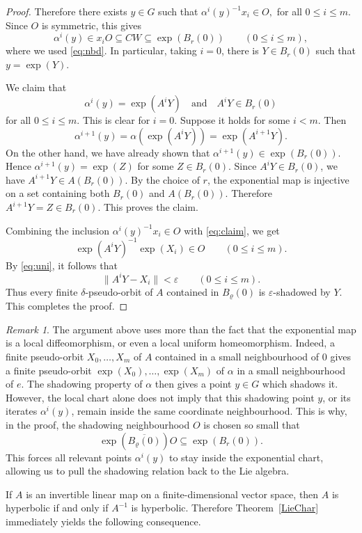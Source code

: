 \documentclass[12pt]{amsart}
\theoremstyle{definition}
\numberwithin{equation}{section}
\theoremstyle{remark}
\newtheorem{remark}[theorem]{Remark}
\begin{document}
\begin{proof}
Therefore there exists $y\in G$ such that
$
\alpha^i(y)^{-1}x_i\in O,
$
for all $0\leq i\leq m$.
Since $O$ is symmetric, this gives
\[
\alpha^i(y)\in x_iO\subseteq CW\subseteq \exp(B_r(0))
\qquad (0\leq i\leq m),
\]
where we used \eqref{eq:nbd}. In particular, taking
$i=0$, there is $Y\in B_r(0)$ such that
$
y=\exp(Y).
$

We claim that
\begin{equation}\label{eq:claim}
\alpha^i(y)=\exp(A^iY)
\quad\text{and}\quad
A^iY\in B_r(0)
\end{equation}
for all $0\leq i\leq m$. This is clear for $i=0$. Suppose it holds for
some $i<m$. Then
\[
\alpha^{i+1}(y)
=
\alpha(\exp(A^iY))
=
\exp(A^{i+1}Y).
\]
On the other hand, we have already shown that
$\alpha^{i+1}(y)\in\exp(B_r(0))$. Hence
$\alpha^{i+1}(y)=\exp(Z)$ for some $Z\in B_r(0)$. Since
$A^iY\in B_r(0)$, we have $A^{i+1}Y\in A(B_r(0))$. By the choice of $r$,
the exponential map is injective on a set containing both $B_r(0)$ and
$A(B_r(0))$. Therefore $A^{i+1}Y=Z\in B_r(0)$. This proves the claim.

Combining the inclusion $\alpha^i(y)^{-1}x_i\in O$
 with
\eqref{eq:claim}, we get
\[
\exp(A^iY)^{-1}\exp(X_i)\in O
\qquad (0\leq i\leq m).
\]
By \eqref{eq:uni}, it follows that
\[
\|A^iY-X_i\|<\varepsilon
\qquad (0\leq i\leq m).
\]
Thus every finite $\delta$-pseudo-orbit of $A$ contained in
$B_\varrho(0)$ is $\varepsilon$-shadowed by $Y$.
This completes the proof.
\end{proof}

\begin{remark}
The argument above uses more than the fact that the exponential map is a
local diffeomorphism, or even a local uniform homeomorphism. Indeed, a finite
pseudo-orbit $X_0,\ldots,X_m$ of $A$ contained in a small neighbourhood of
$0$ gives a finite pseudo-orbit $\exp(X_0),\ldots,\exp(X_m)$ of $\alpha$ in
a small neighbourhood of $e$. The shadowing property of $\alpha$ then gives
a point $y\in G$ which shadows it. However, the local chart alone does not
imply that this shadowing point $y$, or its iterates $\alpha^i(y)$, remain
inside the same coordinate neighbourhood. This is why, in the proof, the
shadowing neighbourhood $O$ is chosen so small that
\[
\exp(\overline{B_\varrho(0)})O\subseteq \exp(B_r(0)).
\]
This forces all relevant points $\alpha^i(y)$ to stay inside the exponential
chart, allowing us to pull the shadowing relation back to the Lie algebra.
\end{remark}

If $A$ is an invertible linear map on a finite-dimensional vector space, then
$A$ is hyperbolic if and only if $A^{-1}$ is hyperbolic. Therefore
Theorem~\ref{LieChar} immediately yields the following consequence.
\end{document}
